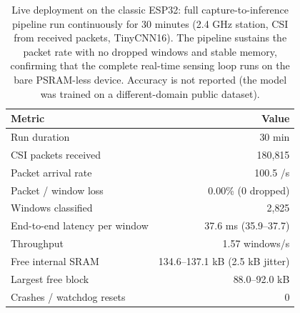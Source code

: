 \begin{table}[t]
\centering
\caption{Live deployment on the classic ESP32: full capture-to-inference pipeline run
continuously for 30 minutes (2.4 GHz station, CSI from received packets, TinyCNN16). The
pipeline sustains the packet rate with no dropped windows and stable memory, confirming
that the complete real-time sensing loop runs on the bare PSRAM-less device. Accuracy is
not reported (the model was trained on a different-domain public dataset).}
\label{tab:live}
\begin{tabular}{lr}
\hline
Metric & Value \\
\hline
Run duration                 & 30 min \\
CSI packets received         & 180{,}815 \\
Packet arrival rate          & 100.5 /s \\
Packet / window loss         & 0.00\% (0 dropped) \\
Windows classified           & 2{,}825 \\
End-to-end latency per window & 37.6 ms (35.9--37.7) \\
Throughput                   & 1.57 windows/s \\
Free internal SRAM           & 134.6--137.1 kB (2.5 kB jitter) \\
Largest free block           & 88.0--92.0 kB \\
Crashes / watchdog resets    & 0 \\
\hline
\end{tabular}
\end{table}
